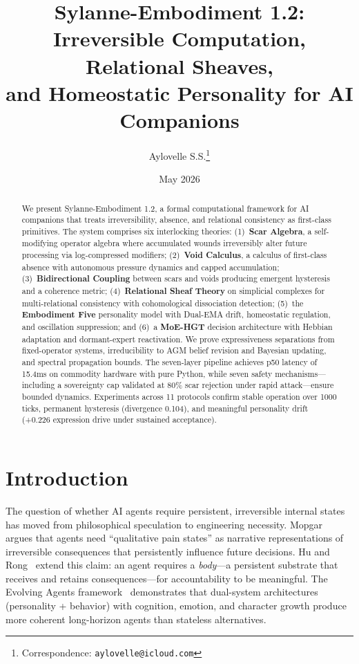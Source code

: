 \documentclass[11pt]{article}
\title{Sylanne-Embodiment 1.2: Irreversible Computation, Relational Sheaves,\\and Homeostatic Personality for AI Companions}
\author{
  Aylovelle S.S.\thanks{Correspondence: \texttt{aylovelle@icloud.com}}
}
\date{May 2026}
\begin{document}
\maketitle

\begin{abstract}
We present Sylanne-Embodiment 1.2, a formal computational framework for AI companions that treats irreversibility, absence, and relational consistency as first-class primitives. The system comprises six interlocking theories: (1)~\textbf{Scar Algebra}, a self-modifying operator algebra where accumulated wounds irreversibly alter future processing via log-compressed modifiers; (2)~\textbf{Void Calculus}, a calculus of first-class absence with autonomous pressure dynamics and capped accumulation; (3)~\textbf{Bidirectional Coupling} between scars and voids producing emergent hysteresis and a coherence metric; (4)~\textbf{Relational Sheaf Theory} on simplicial complexes for multi-relational consistency with cohomological dissociation detection; (5)~the \textbf{Embodiment Five} personality model with Dual-EMA drift, homeostatic regulation, and oscillation suppression; and (6)~a \textbf{MoE-HGT} decision architecture with Hebbian adaptation and dormant-expert reactivation. We prove expressiveness separations from fixed-operator systems, irreducibility to AGM belief revision and Bayesian updating, and spectral propagation bounds. The seven-layer pipeline achieves p50 latency of 15.4ms on commodity hardware with pure Python, while seven safety mechanisms---including a sovereignty cap validated at 80\% scar rejection under rapid attack---ensure bounded dynamics. Experiments across 11 protocols confirm stable operation over 1000 ticks, permanent hysteresis (divergence 0.104), and meaningful personality drift (+0.226 expression drive under sustained acceptance).
\end{abstract}

\section{Introduction}
\label{sec:intro}

The question of whether AI agents require persistent, irreversible internal states has moved from philosophical speculation to engineering necessity. Mopgar~\cite{mopgar2026} argues that agents need ``qualitative pain states'' as narrative representations of irreversible consequences that persistently influence future decisions. Hu and Rong~\cite{hu2026} extend this claim: an agent requires a \emph{body}---a persistent substrate that receives and retains consequences---for accountability to be meaningful. The Evolving Agents framework~\cite{evolving2024} demonstrates that dual-system architectures (personality + behavior) with cognition, emotion, and character growth produce more coherent long-horizon agents than stateless alternatives.
\end{document}
